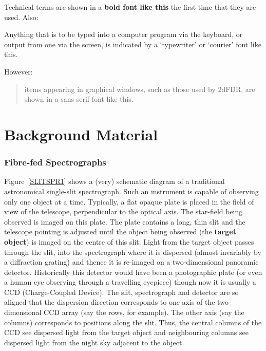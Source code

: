\documentclass[twoside,11pt]{starlink}
\begin{document}
Technical terms are shown in a \textbf{bold font like this} the first
time that they are used.  Also:

\begin{terminalv}
Anything that is to be typed into a computer program via the keyboard,
or output from one via the screen, is indicated by a `typewriter' or
`courier' font like this.
\end{terminalv}

However:

\begin{quote}
\textsf{items appearing in graphical windows, such as those used by 2dFDR,
are shown in a sans serif font like this.}
\end{quote}


\cleardoublepage

\part{Background Material}

\section{\label{SPECTR}Fibre-fed Spectrographs}

Figure~\ref{SLITSPR1} shows a (very) schematic diagram of a traditional
astronomical single-slit spectrograph.  Such an instrument is capable of
observing only one object at a time.  Typically, a flat opaque plate is
placed in the field of view of the telescope, perpendicular to the optical
axis.  The star-field being observed is imaged on this plate.  The plate
contains a long, thin slit and the telescope pointing is adjusted until
the object being observed (the \textbf{target object}) is imaged on the
centre of this slit.  Light from the target object passes through the
slit, into the spectrograph where it is dispersed (almost invariably by
a diffraction grating) and thence it is re-imaged on a two-dimensional
panoramic detector.  Historically this detector would have been a
photographic plate (or even a human eye observing through a travelling
eyepiece) though now it is usually a CCD (Charge-Coupled Device).  The
slit, spectrograph and detector are so aligned that the dispersion
direction corresponds to one axis of the two-dimensional CCD array
(say the rows, for example).  The other axis (say the columns)
corresponds to positions along the slit.  Thus, the central columns
of the CCD see dispersed light from the target object and neighbouring
columns see dispersed light from the night sky adjacent to the object.
\end{document}
